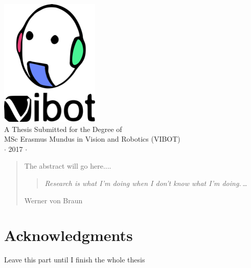\vspace{2cm}
\begin{center}
{
\includegraphics[height=0.1\textheight]{figures/vibot_logo_transparent.png}
\\
\large A Thesis Submitted for the Degree of \\MSc Erasmus Mundus
in Vision and Robotics (VIBOT) \\\vspace{0.3cm} $\cdot$ 2017
$\cdot$}
\end{center}
\singlespacing


\begin{abstract}
The abstract will go here....

\vspace*{5cm}



\begin{center}
\begin{quote}
\it Research is what I'm doing when I don't know what I'm
doing.\,\ldots
\end{quote}
\end{center}
\hfill{\small Werner von Braun}

\end{abstract}

\doublespacing

\setcounter{page}{1} \pagestyle{plain}


\tableofcontents

\listoffigures
\listoftables

\chapter*{Acknowledgments}
         {\protect{}}

Leave this part until I finish the whole thesis

\pagestyle{fancy}
